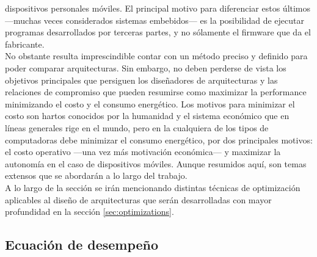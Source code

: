 dispositivos personales móviles. El principal motivo para diferenciar estos 
últimos ---muchas veces considerados sistemas embebidos--- es la posibilidad 
de ejecutar programas desarrollados por terceras partes, y no sólamente el 
firmware que da el fabricante.\\
No obstante resulta imprescindible contar con un método preciso y definido para 
poder comparar arquitecturas. Sin embargo, no deben perderse de vista los 
objetivos principales que persiguen los diseñadores de arquitecturas y las 
relaciones de compromiso que pueden resumirse como maximizar la performance 
minimizando el costo y el consumo energético. Los motivos para minimizar el 
costo son hartos conocidos por la humanidad y el sistema económico que en 
líneas generales rige en el mundo, pero en la cualquiera de los tipos de 
computadoras debe minimizar el consumo energético, por dos principales motivos: 
el costo operativo ---una vez más motivación económica--- y maximizar la 
autonomía en el caso de dispositivos móviles. Aunque resumidos aquí, son temas 
extensos que se abordarán a lo largo del trabajo.\\
A lo largo de la sección se irán mencionando distintas técnicas de optimización 
aplicables al diseño de arquitecturas que serán desarrolladas con mayor
profundidad en la sección \ref{sec:optimizations}.

\subsection{Ecuación de desempeño}
\label{subsec:performance-performance_definition}


